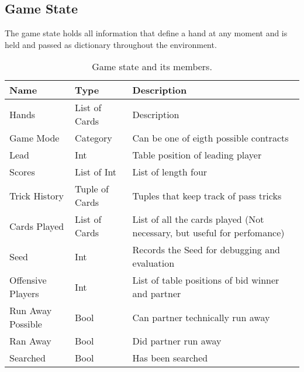 \subsection{Game State}
The game state holds all information that define a hand at any moment and is held and passed as dictionary throughout
the environment.
\newline
\begin{table}[h!]
\begin{tabular}{lll}
Name              & Type           & Description                                                             \\
\hline
Hands             & List of Cards  & Description                                                             \\
Game Mode         & Category       & Can be one of eigth possible contracts                                  \\
Lead              & Int            & Table position of leading player                                        \\
Scores            & List of Int    & List of length four                                                     \\
Trick History     & Tuple of Cards & Tuples that keep track of pass tricks                                   \\
Cards Played      & List of Cards  & List of all the cards played (Not necessary, but useful for perfomance) \\
Seed              & Int            & Records the Seed for debugging and evaluation                           \\
Offensive Players & Int            & List of table positions of bid winner and partner                       \\
Run Away Possible & Bool           & Can partner technically run away                                        \\
Ran Away          & Bool           & Did partner run away                                                    \\
Searched          & Bool           & Has been searched
\end{tabular}
\caption{Game state and its members.}
\label{tab:gamestate}
\end{table}

